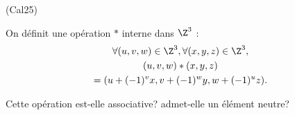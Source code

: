 \begin{tiny}(Cal25)\end{tiny} On définit une opération $*$ interne dans $\Z^3$ :
\begin{multline*}
\forall(u,v,w)\in \Z^3, \forall(x,y,z)\in \Z^3,\\
(u,v,w) * (x,y,z) \\
= (u + (-1)^v x, v + (-1)^w y, w + (-1)^u z).
\end{multline*}

Cette opération est-elle associative? admet-elle un élément neutre?
